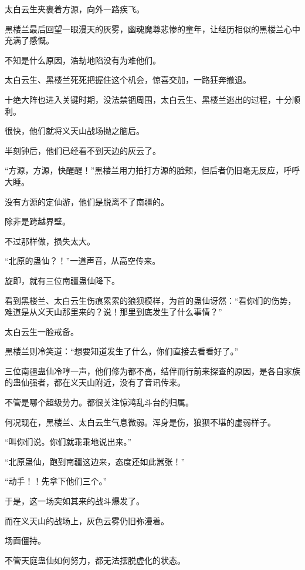
\begin{this_body}

太白云生夹裹着方源，向外一路疾飞。

黑楼兰最后回望一眼漫天的灰雾，幽魂魔尊悲惨的童年，让经历相似的黑楼兰心中充满了感慨。

不知是什么原因，浩劫地陷没有为难他们。

太白云生、黑楼兰死死把握住这个机会，惊喜交加，一路狂奔撤退。

十绝大阵也进入关键时期，没法禁锢周围，太白云生、黑楼兰逃出的过程，十分顺利。

很快，他们就将义天山战场抛之脑后。

半刻钟后，他们已经看不到天边的灰云了。

“方源，方源，快醒醒！”黑楼兰用力拍打方源的脸颊，但后者仍旧毫无反应，呼呼大睡。

没有方源的定仙游，他们是脱离不了南疆的。

除非是跨越界壁。

不过那样做，损失太大。

“北原的蛊仙？！”一道声音，从高空传来。

旋即，就有三位南疆蛊仙降下。

看到黑楼兰、太白云生伤痕累累的狼狈模样，为首的蛊仙讶然：“看你们的伤势，难道是从义天山那里来的？说！那里到底发生了什么事情？”

太白云生一脸戒备。

黑楼兰则冷笑道：“想要知道发生了什么，你们直接去看看好了。”

三位南疆蛊仙冷哼一声，他们修为都不高，结伴而行前来探查的原因，是各自家族的蛊仙强者，都在义天山附近，没有了音讯传来。

不管是哪个超级势力。都很关注惊鸿乱斗台的归属。

何况现在，黑楼兰、太白云生气息微弱。浑身是伤，狼狈不堪的虚弱样子。

“叫你们说。你们就乖乖地说出来。”

“北原蛊仙，跑到南疆这边来，态度还如此嚣张！”

“动手！！先拿下他们三个。”

于是，这一场突如其来的战斗爆发了。

而在义天山的战场上，灰色云雾仍旧弥漫着。

场面僵持。

不管天庭蛊仙如何努力，都无法摆脱虚化的状态。


\end{this_body}

